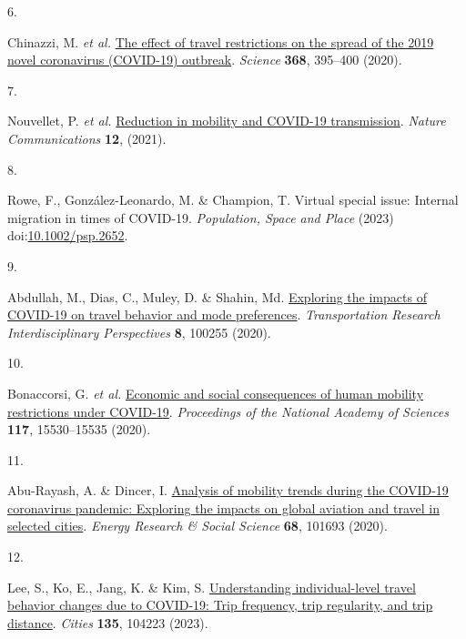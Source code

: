 \documentclass[
  11pt,
]{article}
\newlength{\cslhangindent}
\newlength{\csllabelwidth}
\newlength{\cslentryspacingunit} %
\newenvironment{CSLReferences}[2] %
 {%
  \setlength{\parindent}{0pt}
  \ifodd #1
  \let\oldpar\par
  \def\par{\hangindent=\cslhangindent\oldpar}
  \fi
  \setlength{\parskip}{#2\cslentryspacingunit}
 }%
 {}
\newcommand{\CSLLeftMargin}[1]{\parbox[t]{\csllabelwidth}{#1}}
\newcommand{\CSLRightInline}[1]{\parbox[t]{\linewidth - \csllabelwidth}{#1}\break}
\begin{document}
\begin{CSLReferences}{0}{0}
\leavevmode{}%
\CSLLeftMargin{6. }%
\CSLRightInline{Chinazzi, M. \emph{et al.}
\href{https://doi.org/10.1126/science.aba9757}{The effect of travel
restrictions on the spread of the 2019 novel coronavirus (COVID-19)
outbreak}. \emph{Science} \textbf{368}, 395--400 (2020).}

\leavevmode{}%
\CSLLeftMargin{7. }%
\CSLRightInline{Nouvellet, P. \emph{et al.}
\href{https://doi.org/10.1038/s41467-021-21358-2}{Reduction in mobility
and COVID-19 transmission}. \emph{Nature Communications} \textbf{12},
(2021).}

\leavevmode{}%
\CSLLeftMargin{8. }%
\CSLRightInline{Rowe, F., González-Leonardo, M. \& Champion, T. Virtual
special issue: Internal migration in times of COVID{-}19.
\emph{Population, Space and Place} (2023)
doi:\href{https://doi.org/10.1002/psp.2652}{10.1002/psp.2652}.}

\leavevmode{}%
\CSLLeftMargin{9. }%
\CSLRightInline{Abdullah, M., Dias, C., Muley, D. \& Shahin, Md.
\href{https://doi.org/10.1016/j.trip.2020.100255}{Exploring the impacts
of COVID-19 on travel behavior and mode preferences}.
\emph{Transportation Research Interdisciplinary Perspectives}
\textbf{8}, 100255 (2020).}

\leavevmode{}%
\CSLLeftMargin{10. }%
\CSLRightInline{Bonaccorsi, G. \emph{et al.}
\href{https://doi.org/10.1073/pnas.2007658117}{Economic and social
consequences of human mobility restrictions under COVID-19}.
\emph{Proceedings of the National Academy of Sciences} \textbf{117},
15530--15535 (2020).}

\leavevmode{}%
\CSLLeftMargin{11. }%
\CSLRightInline{Abu-Rayash, A. \& Dincer, I.
\href{https://doi.org/10.1016/j.erss.2020.101693}{Analysis of mobility
trends during the COVID-19 coronavirus pandemic: Exploring the impacts
on global aviation and travel in selected cities}. \emph{Energy Research
\& Social Science} \textbf{68}, 101693 (2020).}

\leavevmode{}%
\CSLLeftMargin{12. }%
\CSLRightInline{Lee, S., Ko, E., Jang, K. \& Kim, S.
\href{https://doi.org/10.1016/j.cities.2023.104223}{Understanding
individual-level travel behavior changes due to COVID-19: Trip
frequency, trip regularity, and trip distance}. \emph{Cities}
\textbf{135}, 104223 (2023).}


\end{CSLReferences}
\end{document}
